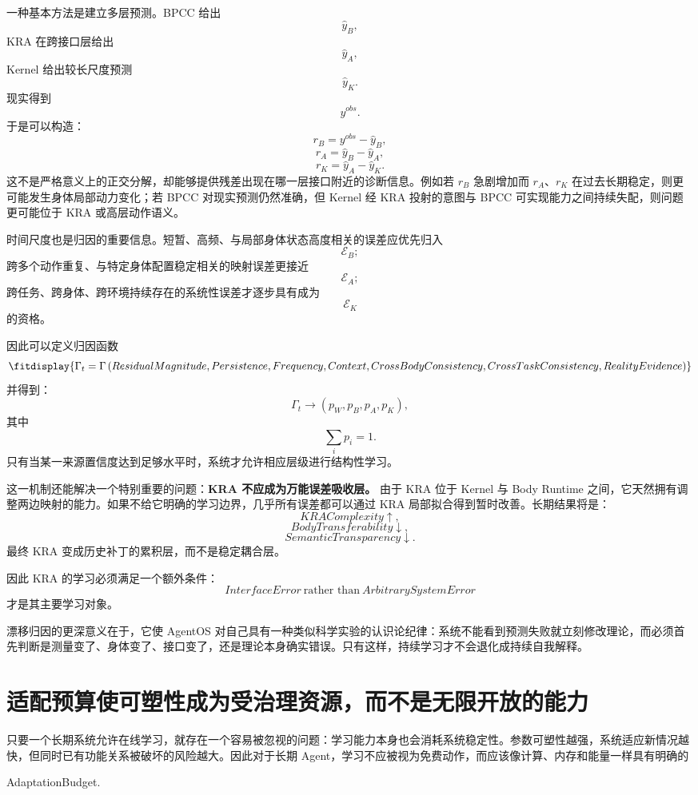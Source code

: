 一种基本方法是建立多层预测。BPCC 给出
\[
\hat y_B,
\]
KRA 在跨接口层给出
\[
\hat y_A,
\]
Kernel 给出较长尺度预测
\[
\hat y_K.
\]
现实得到
\[
y^{obs}.
\]
于是可以构造：
\[
r_B
=
y^{obs}-\hat y_B,
\]
\[
r_A
=
\hat y_B-\hat y_A,
\]
\[
r_K
=
\hat y_A-\hat y_K.
\]
这不是严格意义上的正交分解，却能够提供残差出现在哪一层接口附近的诊断信息。例如若 $r_B$ 急剧增加而 $r_A$、$r_K$ 在过去长期稳定，则更可能发生身体局部动力变化；若 BPCC 对现实预测仍然准确，但 Kernel 经 KRA 投射的意图与 BPCC 可实现能力之间持续失配，则问题更可能位于 KRA 或高层动作语义。

时间尺度也是归因的重要信息。短暂、高频、与局部身体状态高度相关的误差应优先归入
\[
\mathcal E_B;
\]
跨多个动作重复、与特定身体配置稳定相关的映射误差更接近
\[
\mathcal E_A;
\]
跨任务、跨身体、跨环境持续存在的系统性误差才逐步具有成为
\[
\mathcal E_K
\]
的资格。

因此可以定义归因函数
\[
\fitdisplay{
\Gamma_t
=
\Gamma
\left(
ResidualMagnitude,
Persistence,
Frequency,
Context,
CrossBodyConsistency,
CrossTaskConsistency,
RealityEvidence
\right)
}
\]
并得到：
\[
\Gamma_t
\rightarrow
\left(
p_W,p_B,p_A,p_K
\right),
\]
其中
\[
\sum_i p_i=1.
\]
只有当某一来源置信度达到足够水平时，系统才允许相应层级进行结构性学习。

这一机制还能解决一个特别重要的问题：\textbf{KRA 不应成为万能误差吸收层。} 由于 KRA 位于 Kernel 与 Body Runtime 之间，它天然拥有调整两边映射的能力。如果不给它明确的学习边界，几乎所有误差都可以通过 KRA 局部拟合得到暂时改善。长期结果将是：
\[
KRAComplexity\uparrow,
\]
\[
BodyTransferability\downarrow,
\]
\[
SemanticTransparency\downarrow.
\]
最终 KRA 变成历史补丁的累积层，而不是稳定耦合层。

因此 KRA 的学习必须满足一个额外条件：
\[
\boxed{
InterfaceError
\ \text{rather than}\ 
ArbitrarySystemError
}
\]
才是其主要学习对象。

漂移归因的更深意义在于，它使 AgentOS 对自己具有一种类似科学实验的认识论纪律：系统不能看到预测失败就立刻修改理论，而必须首先判断是测量变了、身体变了、接口变了，还是理论本身确实错误。只有这样，持续学习才不会退化成持续自我解释。

\section{适配预算使可塑性成为受治理资源，而不是无限开放的能力}

只要一个长期系统允许在线学习，就存在一个容易被忽视的问题：学习能力本身也会消耗系统稳定性。参数可塑性越强，系统适应新情况越快，但同时已有功能关系被破坏的风险越大。因此对于长期 Agent，学习不应被视为免费动作，而应该像计算、内存和能量一样具有明确的
\begin{statementbox}
AdaptationBudget.
\end{statementbox}


